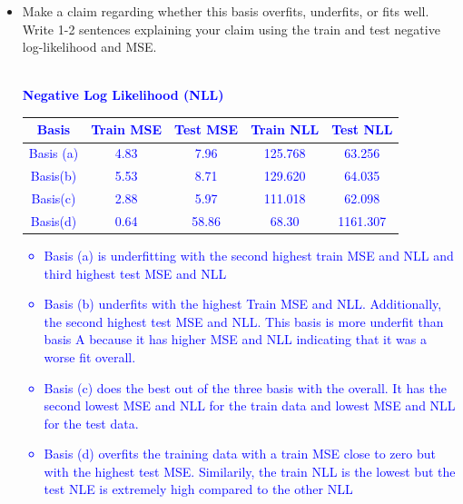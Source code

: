 \documentclass[submit]{harvardml}
\begin{document}
\begin{framed}
\begin{enumerate}
\begin{itemize}
\item Make a claim regarding whether this basis overfits, 
underfits, or fits well. Write 1-2 sentences explaining your 
claim using the train and test negative log-likelihood and MSE.\\
\textcolor{blue}{
\\\textbf{Negative Log Likelihood (NLL)}
\begin{center}
\begin{tabular}{ |c|c|c|c|c|} 
 \hline
   Basis & Train MSE & Test MSE & Train NLL & Test NLL  \\ 
 \hline
Basis (a) & 4.83 & 7.96 & 125.768 & 63.256 \\ 
 \hline
Basis(b) & 5.53 & 8.71 & 129.620 & 64.035\\
 \hline
Basis(c) & 2.88 & 5.97 & 111.018 & 62.098\\
 \hline
Basis(d) & 0.64 & 58.86 & 68.30 & 1161.307\\
 \hline
\end{tabular}
\label{Train MSE}
\end{center}
\begin{itemize}
    \item Basis (a) is underfitting with the second highest train MSE and NLL and third highest test MSE and NLL \\
    \item Basis (b) underfits with the highest Train MSE and NLL. Additionally, the second highest test MSE and NLL. This basis is more underfit than basis A because it has higher MSE and NLL indicating that it was a worse fit overall. \\
    \item Basis (c) does the best out of the three basis with the overall. It has the second lowest MSE and NLL for the train data and lowest MSE and NLL for the test data. \\
    \item Basis (d) overfits the training data with a train MSE close to zero but with the highest test MSE. Similarily, the train NLL is the lowest but the test NLE is extremely high compared to the other NLL
\end{itemize}
}

\end{itemize}
\end{enumerate}
\end{framed}
\end{document}
